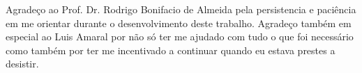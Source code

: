 
Agradeço ao Prof. Dr. Rodrigo Bonifacio de Almeida pela persistencia e paciência em me orientar 
durante o desenvolvimento deste trabalho.
Agradeço também em especial ao Luis Amaral por não só ter me ajudado com tudo o que foi necessário 
como também por ter me incentivado a continuar quando eu estava prestes a desistir.